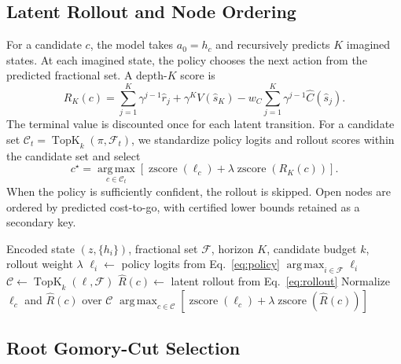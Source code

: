 \documentclass[11pt,a4paper]{article}
\newcommand{\argmax}{\operatorname*{arg\,max}}
\newcommand{\softmax}{\operatorname{softmax}}
\newcommand{\fracset}{\mathcal{F}}
\begin{document}
\subsection{Latent Rollout and Node Ordering}

For a candidate $c$, the model takes $a_0=h_c$ and recursively predicts $K$ imagined states. At each imagined state, the policy chooses the next action from the predicted fractional set. A depth-$K$ score is
\begin{equation}
  R_K(c)=
  \sum_{j=1}^{K}\gamma^{j-1}\widehat r_j
  +\gamma^{K}V(\widehat s_K)
  -w_C\sum_{j=1}^{K}\gamma^{j-1}\widehat C(\widehat s_j).
  \label{eq:rollout}
\end{equation}
The terminal value is discounted once for each latent transition. For a candidate set $\mathcal{C}_t=\operatorname{TopK}_k(\pi,\fracset_t)$, we standardize policy logits and rollout scores within the candidate set and select
\begin{equation}
  c^\star=
  \argmax_{c\in\mathcal{C}_t}
    \left[
      \operatorname{zscore}(\ell_c)
      +\lambda\operatorname{zscore}(R_K(c))
    \right].
  \label{eq:anchored-policy}
\end{equation}
When the policy is sufficiently confident, the rollout is skipped. Open nodes are ordered by predicted cost-to-go, with certified lower bounds retained as a secondary key.

\begin{algorithm}[t]
\caption{Policy-anchored latent branching}
\label{alg:branch}
\begin{algorithmic}[1]
\Require Encoded state $(z,\{h_i\})$, fractional set $\fracset$, horizon $K$,
         candidate budget $k$, rollout weight $\lambda$
\State $\ell_i\gets$ policy logits from Eq.~\eqref{eq:policy}
\If{$\max_{i\in\fracset}\softmax(\ell)_i\ge\theta$}
  \State \Return $\argmax_{i\in\fracset}\ell_i$
\EndIf
\State $\mathcal{C}\gets\operatorname{TopK}_k(\ell,\fracset)$
  \State $\widehat R(c)\gets$ latent rollout from Eq.~\eqref{eq:rollout}
\EndFor
\State Normalize $\ell_c$ and $\widehat R(c)$ over $\mathcal{C}$
\State \Return $\argmax_{c\in\mathcal{C}}
  [\operatorname{zscore}(\ell_c)+\lambda\operatorname{zscore}(\widehat R(c))]$
\end{algorithmic}
\end{algorithm}

\subsection{Root Gomory-Cut Selection}
\end{document}
